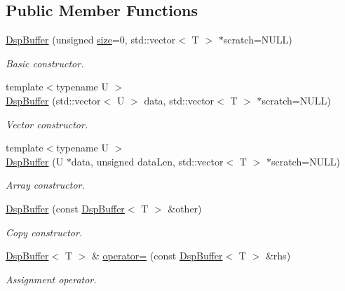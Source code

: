 \subsection*{Public Member Functions}
\begin{DoxyCompactItemize}
\item 
\hyperlink{class_smart_dsp_1_1_dsp_buffer_aac9cefffb64fddbc22575b5592106566}{Dsp\+Buffer} (unsigned \hyperlink{class_smart_dsp_1_1_dsp_buffer_af931c57c26c1f459cae47ca4b249d402}{size}=0, std\+::vector$<$ T $>$ $\ast$scratch=N\+U\+L\+L)
\begin{DoxyCompactList}\small\item\em Basic constructor. \end{DoxyCompactList}\item 
{\footnotesize template$<$typename U $>$ }\\\hyperlink{class_smart_dsp_1_1_dsp_buffer_aeacaa5323f91a1c1a38ba1cc0b66f154}{Dsp\+Buffer} (std\+::vector$<$ U $>$ data, std\+::vector$<$ T $>$ $\ast$scratch=N\+U\+L\+L)
\begin{DoxyCompactList}\small\item\em Vector constructor. \end{DoxyCompactList}\item 
{\footnotesize template$<$typename U $>$ }\\\hyperlink{class_smart_dsp_1_1_dsp_buffer_a97d1b8eeeef8b83d3d5197ea8f9c14fd}{Dsp\+Buffer} (U $\ast$data, unsigned data\+Len, std\+::vector$<$ T $>$ $\ast$scratch=N\+U\+L\+L)
\begin{DoxyCompactList}\small\item\em Array constructor. \end{DoxyCompactList}\item 
\hyperlink{class_smart_dsp_1_1_dsp_buffer_a8bf1ba415d8ace450b3c6a241165c545}{Dsp\+Buffer} (const \hyperlink{class_smart_dsp_1_1_dsp_buffer}{Dsp\+Buffer}$<$ T $>$ \&other)
\begin{DoxyCompactList}\small\item\em Copy constructor. \end{DoxyCompactList}\item 
\hyperlink{class_smart_dsp_1_1_dsp_buffer}{Dsp\+Buffer}$<$ T $>$ \& \hyperlink{class_smart_dsp_1_1_dsp_buffer_aefbe05ec4f15746bef8086b75be69f18}{operator=} (const \hyperlink{class_smart_dsp_1_1_dsp_buffer}{Dsp\+Buffer}$<$ T $>$ \&rhs)
\begin{DoxyCompactList}\small\item\em Assignment operator. \end{DoxyCompactList}\item 

\end{DoxyCompactItemize}
